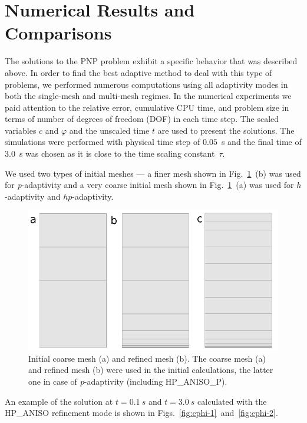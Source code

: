 \section{Numerical Results and Comparisons}\label{sec:results}


The solutions to the PNP problem exhibit a specific behavior that was 
described above. In order to find the best adaptive method to deal with 
this type of problems, we performed numerous computations using all 
adaptivity modes in both the single-mesh and multi-mesh regimes.
In the numerical experiments we paid attention to the 
relative error, cumulative CPU time, and problem size 
in terms of number of degrees of freedom (DOF) in each 
time step. The scaled variables $c$
and $\varphi$ and the unscaled time $t$ are used to present the solutions.
The simulations were performed with physical time step of $0.05$~s and
the final time of $3.0$~s was chosen as it is close to the time
scaling constant~$\tau$.

We used two types of initial meshes --- a finer mesh shown 
in Fig.~\ref{fig:mesh}~(b) was used for \emph{p}-adaptivity
and a very coarse initial mesh shown in  Fig.~\ref{fig:mesh}~(a) was 
used for $h$-adaptivity and $hp$-adaptivity.

\begin{figure}[!ht]
  \begin{centering}
  \includegraphics[width=.6\columnwidth]{mesh}
  \caption{\label{fig:mesh} Initial coarse mesh (a)
  	and refined mesh (b). The coarse mesh (a)
	and refined mesh (b) were used in the initial calculations, the latter one
	in case of \emph{p}-adaptivity (including HP\_ANISO\_P).}
  \end{centering}
\end{figure}

An example of the solution at $t=0.1\ s$ and $t=3.0\ s$ 
calculated with the HP\_ANISO refinement mode is shown
in Figs.~\ref{fig:cphi-1}~and~\ref{fig:cphi-2}. 

